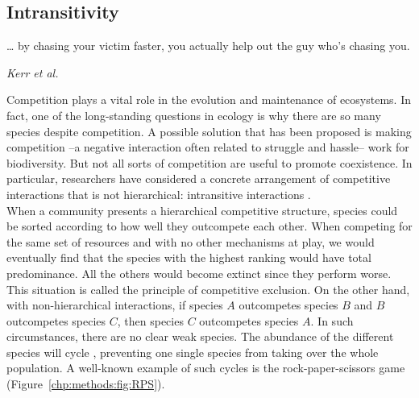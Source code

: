 \subsection{Intransitivity}\label{chp:methods:intra}
\epigraph{… by chasing your victim faster, you actually help out the guy who’s chasing you.}{\textit{Kerr et al.} \cite{kerr2002local}}
Competition plays a vital role in the evolution and maintenance of ecosystems. In fact, one of the long-standing questions in ecology is why there are so many species despite competition. A possible solution that has been proposed is making competition --a negative interaction often related to struggle and hassle-- work for biodiversity. But not all sorts of competition are useful to promote coexistence. In particular, researchers have considered a concrete arrangement of competitive interactions that is not hierarchical: intransitive interactions \cite{soliveres2018everything}. \\

When a community presents a hierarchical competitive structure, species could be sorted according to how well they outcompete each other. When competing for the same set of resources and with no other mechanisms at play, we would eventually find that the species with the highest ranking would have total predominance. All the others would become extinct since they perform worse. This situation is called the principle of competitive exclusion. On the other hand, with non-hierarchical interactions, if species $A$ outcompetes species $B$ and $B$ outcompetes species $C$, then species $C$ outcompetes species $A$. In such circumstances, there are no clear weak species. The abundance of the different species will cycle \cite{may1975nonlinear}, preventing one single species from taking over the whole population.  A well-known example of such cycles is the rock-paper-scissors game (Figure~\ref{chp:methods:fig:RPS}).  \\

